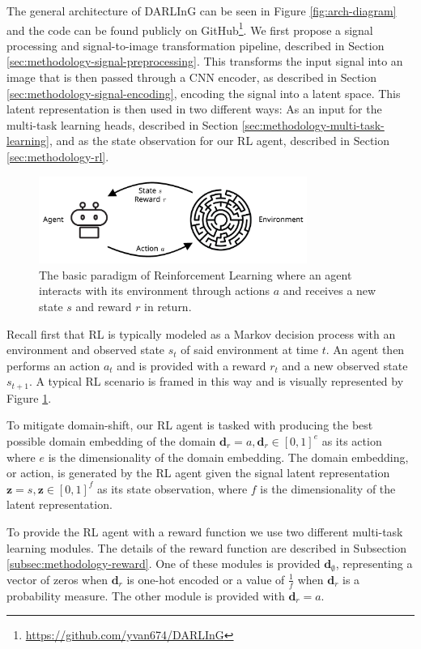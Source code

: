 The general architecture of DARLInG can be seen in Figure \ref{fig:arch-diagram} and the code can be found publicly on GitHub\footnote{\href{https://github.com/yvan674/DARLInG}{https://github.com/yvan674/DARLInG}}.
We first propose a signal processing and signal-to-image transformation pipeline, described in Section \ref{sec:methodology-signal-preprocessing}.
This transforms the input signal into an image that is then passed through a CNN encoder, as described in Section \ref{sec:methodology-signal-encoding}, encoding the signal into a latent space.
This latent representation is then used in two different ways: As an input for the multi-task learning heads, described in Section \ref{sec:methodology-multi-task-learning}, and as the state observation for our RL agent, described in Section \ref{sec:methodology-rl}.

\begin{figure}
	\centering
	\includegraphics[width=0.78\textwidth]{figures/rl_paradigm}
	\caption{The basic paradigm of Reinforcement Learning where an agent interacts with its environment through actions $a$ and receives a new state $s$ and reward $r$ in return.}\label{fig:rl-paradigm}
\end{figure}
Recall first that RL is typically modeled as a Markov decision process with an environment and observed state $s_t$ of said environment at time $t$.
An agent then performs an action $a_t$ and is provided with a reward $r_t$ and a new observed state $s_{t+1}$.
A typical RL scenario is framed in this way and is visually represented by Figure \ref{fig:rl-paradigm}.

To mitigate domain-shift, our RL agent is tasked with producing the best possible domain embedding of the domain $\boldsymbol{d}_r = a, \boldsymbol{d}_r \in [0, 1]^e$ as its action where $e$ is the dimensionality of the domain embedding.
The domain embedding, or action, is generated by the RL agent given the signal latent representation $\boldsymbol{z} = s, \boldsymbol{z} \in [0, 1]^f$ as its state observation, where $f$ is the dimensionality of the latent representation.

To provide the RL agent with a reward function we use two different multi-task learning modules.
The details of the reward function are described in Subsection \ref{subsec:methodology-reward}.
One of these modules is provided $\boldsymbol{d}_{\emptyset}$, representing a vector of zeros when $\boldsymbol{d}_r$ is one-hot encoded or a value of $\frac{1}{f}$ when $\boldsymbol{d}_r$ is a probability measure.
The other module is provided with $\boldsymbol{d}_{r} = a$.

